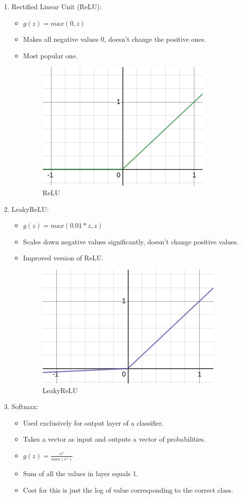 \documentclass{article}
\begin{document}
\begin{enumerate}
\begin{itemize}
		\end{itemize}\pagebreak
		\item Rectified Linear Unit (ReLU):\begin{itemize}
			\item \Large$g(z) = max(0,z)$\large
			\item Makes all negative values 0, doesn't change the positive ones.
			\item Most popular one.
			\begin{figure}[h]
				\centering
				\includegraphics[scale=0.5]{im/relu.png}
				\caption{ReLU}
			\end{figure}
		\end{itemize}
		\item LeakyReLU:\begin{itemize}
			\item \Large$g(z) = max(0.01*z,z)$\large
			\item Scales down negative values significantly, doesn't change positive values.
			\item Improved version of ReLU.
			\begin{figure}[h]
				\centering
				\includegraphics[scale=0.5]{im/leakyrelu.png}
				\caption{LeakyReLU}
			\end{figure}
		\end{itemize}
		\item Softmax:\begin{itemize}
			\item Used exclusively for output layer of a classifier.
			\item Takes a vector as input and outputs a vector of probabilities.
			\item $g(z) = $\LARGE$\frac{e^{z}}{sum(e^z)}$\large
			\item Sum of all the values in layer equals 1.
			\item Cost for this is just the log of value corresponding to the correct class.
		\end{itemize}
	\end{enumerate}
\end{document}
